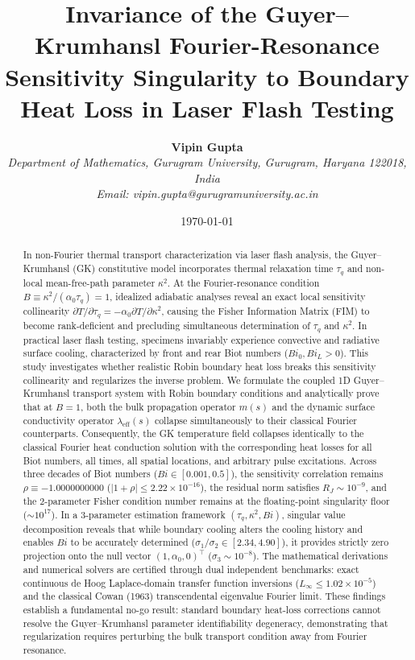\documentclass[review,12pt]{article}
\title{\textbf{Invariance of the Guyer--Krumhansl Fourier-Resonance Sensitivity Singularity to Boundary Heat Loss in Laser Flash Testing}}
\author{
    \textbf{Vipin Gupta} \\
    \textit{Department of Mathematics, Gurugram University, Gurugram, Haryana 122018, India} \\
    \textit{Email: vipin.gupta@gurugramuniversity.ac.in}
}
\date{\today}
\begin{document}
\maketitle

\begin{abstract}
In non-Fourier thermal transport characterization via laser flash analysis, the Guyer--Krumhansl (GK) constitutive model incorporates thermal relaxation time $\tau_q$ and non-local mean-free-path parameter $\kappa^2$. At the Fourier-resonance condition $B \equiv \kappa^2 / (\alpha_0 \tau_q) = 1$, idealized adiabatic analyses reveal an exact local sensitivity collinearity $\partial T / \partial \tau_q = -\alpha_0 \partial T / \partial \kappa^2$, causing the Fisher Information Matrix (FIM) to become rank-deficient and precluding simultaneous determination of $\tau_q$ and $\kappa^2$. In practical laser flash testing, specimens invariably experience convective and radiative surface cooling, characterized by front and rear Biot numbers ($Bi_0, Bi_L > 0$). This study investigates whether realistic Robin boundary heat loss breaks this sensitivity collinearity and regularizes the inverse problem. We formulate the coupled 1D Guyer--Krumhansl transport system with Robin boundary conditions and analytically prove that at $B = 1$, both the bulk propagation operator $m(s)$ and the dynamic surface conductivity operator $\lambda_{\mathrm{eff}}(s)$ collapse simultaneously to their classical Fourier counterparts. Consequently, the GK temperature field collapses identically to the classical Fourier heat conduction solution with the corresponding heat losses for all Biot numbers, all times, all spatial locations, and arbitrary pulse excitations. Across three decades of Biot numbers ($Bi \in [0.001, 0.5]$), the sensitivity correlation remains $\rho \equiv -1.0000000000$ ($|1+\rho| \le 2.22 \times 10^{-16}$), the residual norm satisfies $R_J \sim 10^{-9}$, and the 2-parameter Fisher condition number remains at the floating-point singularity floor ($\sim 10^{17}$). In a 3-parameter estimation framework $(\tau_q, \kappa^2, Bi)$, singular value decomposition reveals that while boundary cooling alters the cooling history and enables $Bi$ to be accurately determined ($\sigma_1 / \sigma_2 \in [2.34, 4.90]$), it provides strictly zero projection onto the null vector $(1, \alpha_0, 0)^\top$ ($\sigma_3 \sim 10^{-8}$). The mathematical derivations and numerical solvers are certified through dual independent benchmarks: exact continuous de Hoog Laplace-domain transfer function inversions ($L_\infty \le 1.02 \times 10^{-5}$) and the classical Cowan (1963) transcendental eigenvalue Fourier limit. These findings establish a fundamental no-go result: standard boundary heat-loss corrections cannot resolve the Guyer--Krumhansl parameter identifiability degeneracy, demonstrating that regularization requires perturbing the bulk transport condition away from Fourier resonance.
\end{abstract}
\end{document}
